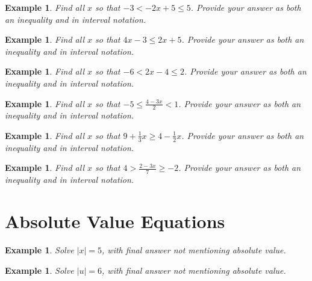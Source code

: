 \documentclass[twoside]{tufte-handout}
\newcommand{\booksection}{0}
\newcommand{\pageheader}{}
\newcounter{ekcounter}%
\theoremstyle{ekimcustom}
\newtheorem{exm}[ekcounter]{Example}
\begin{document}
\begin{exm}{}Find all $x$ so that  $-3<-2x+5\leq 5$. Provide your answer as both an inequality and in interval notation.
\end{exm}\vskip10pt

\begin{exm}{}Find all $x$ so that  $4x-3\leq 2x+5$. Provide your answer as both an inequality and in interval notation.
\end{exm}\vskip10pt

\begin{exm}{}Find all $x$ so that  $-6<2x-4\leq 2$. Provide your answer as both an inequality and in interval notation.
\end{exm}\vskip10pt

\begin{exm}{}Find all $x$ so that  $-5\leq \frac{4-3x}{2}<1$. Provide your answer as both an inequality and in interval notation.
\end{exm}\vskip10pt

\begin{exm}{}Find all $x$ so that  $9+\frac{1}{3}x\geq4-\frac{1}{2}x$. Provide your answer as both an inequality and in interval notation.
\end{exm}\vskip10pt

\begin{exm}{}Find all $x$ so that  $4>\frac{2-3x}{7}\geq-2$. Provide your answer as both an inequality and in interval notation.
\end{exm}\vskip10pt


\renewcommand{\booksection}{Absolute Value Equations}
\renewcommand{\pageheader}{\booksection }
\section*{\LARGE \pageheader}

\everymath{\displaystyle}
\begin{exm}{}Solve  $|x|=5$, with final answer not mentioning absolute value.
\end{exm}\vskip10pt

\begin{exm}{}Solve  $|u|=6$, with final answer not mentioning absolute value.
\end{exm}\vskip10pt
\end{document}

